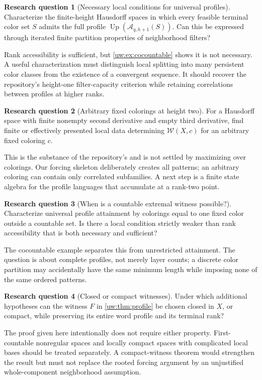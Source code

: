 \documentclass[11pt,letterpaper]{article}
\numberwithin{equation}{section}
\theoremstyle{definition}
\theoremstyle{remark}
\theoremstyle{definition}
\newtheorem{question}{Research question}
\newcommand{\W}{\mathcal W}
\newcommand{\A}{\mathcal A}
\begin{document}
\begin{question}[Necessary local conditions for universal profiles]\label{uw:q:necessary}
Characterize the finite-height Hausdorff spaces in which every feasible
terminal color set $S$ admits the full profile
$\operatorname{Up}(\A_{q,h+1}(S))$. Can this be expressed through iterated
finite partition properties of neighborhood filters?
\end{question}
Rank accessibility is sufficient, but \cref{uw:ex:cocountable} shows it is not
necessary. A useful characterization must distinguish local splitting into
many persistent color classes from the existence of a convergent sequence.
It should recover the repository's height-one filter-capacity criterion while
retaining correlations between profiles at higher ranks.

\begin{question}[Arbitrary fixed colorings at height two]\label{uw:q:height-two}
For a Hausdorff space with finite nonempty second derivative and empty third
derivative, find finite or effectively presented local data determining
$\W(X,c)$ for an arbitrary fixed coloring $c$.
\end{question}
This is the substance of the repository's  and is not
settled by maximizing over colorings. Our forcing skeleton deliberately
creates all patterns; an arbitrary coloring can contain only correlated
subfamilies. A next step is a finite state algebra for the profile languages
that accumulate at a rank-two point.

\begin{question}[When is a countable extremal witness possible?]\label{uw:q:countable}
Characterize universal profile attainment by colorings equal to one fixed
color outside a countable set. Is there a local condition strictly weaker
than rank accessibility that is both necessary and sufficient?
\end{question}
The cocountable example separates this from unrestricted attainment. The
question is about complete profiles, not merely layer counts; a discrete
color partition may accidentally have the same minimum length while imposing
none of the same ordered patterns.

\begin{question}[Closed or compact witnesses]\label{uw:q:closed}
Under which additional hypotheses can the witness $F$ in
\cref{uw:thm:profile} be chosen closed in $X$, or compact, while preserving its
entire word profile and its terminal rank?
\end{question}
The proof given here intentionally does not require either property.
First-countable nonregular spaces and locally compact spaces with complicated
local bases should be treated separately. A compact-witness theorem would
strengthen the result but must not replace the rooted forcing argument by an
unjustified whole-component neighborhood assumption.
\end{document}
